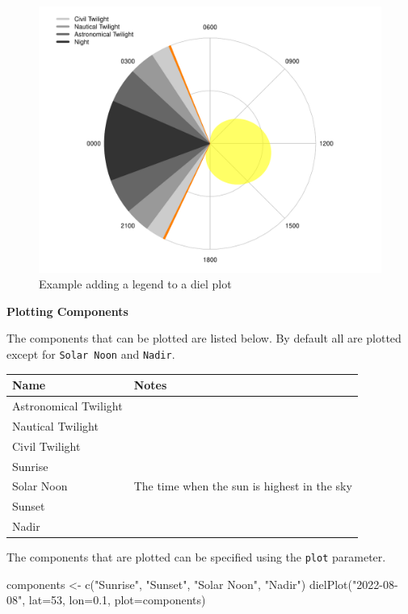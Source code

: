 \documentclass[
]{book}
\newenvironment{Shaded}{\begin{snugshade}}{\end{snugshade}}
\newcommand{\AttributeTok}[1]{\textcolor[rgb]{0.77,0.63,0.00}{#1}}
\newcommand{\DecValTok}[1]{\textcolor[rgb]{0.00,0.00,0.81}{#1}}
\newcommand{\FloatTok}[1]{\textcolor[rgb]{0.00,0.00,0.81}{#1}}
\newcommand{\FunctionTok}[1]{\textcolor[rgb]{0.00,0.00,0.00}{#1}}
\newcommand{\NormalTok}[1]{#1}
\newcommand{\OtherTok}[1]{\textcolor[rgb]{0.56,0.35,0.01}{#1}}
\newcommand{\StringTok}[1]{\textcolor[rgb]{0.31,0.60,0.02}{#1}}
\begin{document}
\begin{figure}

{\centering \includegraphics[width=0.9\linewidth]{_main_files/figure-latex/diel-plot-legend-1} 

}

\caption{Example adding a legend to a diel plot}\label{fig:diel-plot-legend}
\end{figure}

\textbf{Plotting Components}

The components that can be plotted are listed below. By default all are plotted except for \texttt{Solar\ Noon} and \texttt{Nadir}.

\begin{longtable}[]{@{}ll@{}}
\toprule()
Name & Notes \\
\midrule()
\endhead
Astronomical Twilight & \\
Nautical Twilight & \\
Civil Twilight & \\
Sunrise & \\
Solar Noon & The time when the sun is highest in the sky \\
Sunset & \\
Nadir & \\
\bottomrule()
\end{longtable}

The components that are plotted can be specified using the \texttt{plot} parameter.

\begin{Shaded}
\begin{Highlighting}[]
\NormalTok{components }\OtherTok{\textless{}{-}} \FunctionTok{c}\NormalTok{(}\StringTok{"Sunrise"}\NormalTok{, }\StringTok{"Sunset"}\NormalTok{, }\StringTok{"Solar Noon"}\NormalTok{, }\StringTok{"Nadir"}\NormalTok{)}
\FunctionTok{dielPlot}\NormalTok{(}\StringTok{"2022{-}08{-}08"}\NormalTok{, }\AttributeTok{lat=}\DecValTok{53}\NormalTok{, }\AttributeTok{lon=}\FloatTok{0.1}\NormalTok{, }\AttributeTok{plot=}\NormalTok{components)}
\end{Highlighting}
\end{Shaded}
\end{document}
